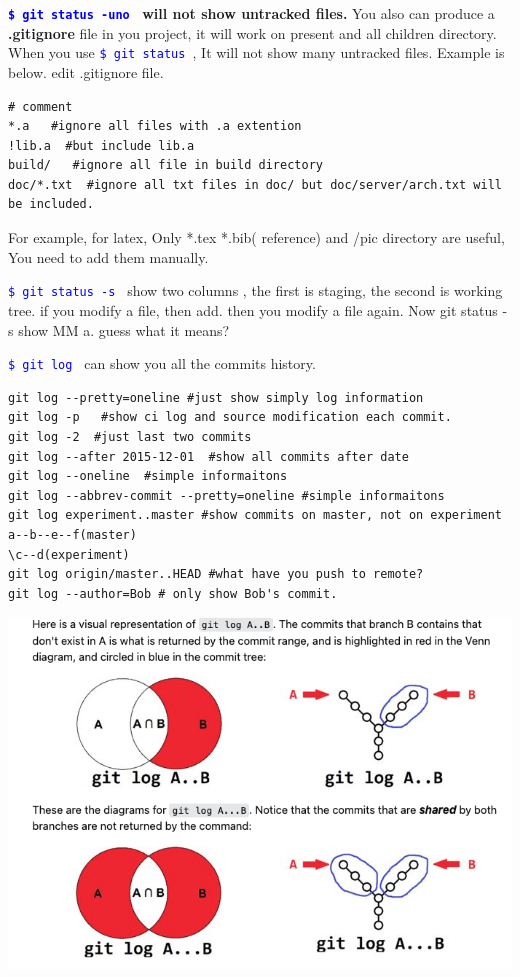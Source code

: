 \documentclass[paper=8.5in:11in, twoside, 12pt, pagesize=pdftex]{book}
\newcommand{\linuxcommand}[1]{\texttt{\textcolor{blue}{\$ #1 \Pisymbol{psy}{191}}}}
\begin{document}
	\textbf{\linuxcommand{git status -uno} will not show untracked files.} You also can produce a \textbf{.gitignore} file in you project, it will work on present and all children directory. When you use \linuxcommand{git status}, It will not show many untracked files.  Example is below. edit .gitignore file.
	
\begin{lstlisting}
# comment
*.a   #ignore all files with .a extention
!lib.a  #but include lib.a
build/   #ignore all file in build directory
doc/*.txt  #ignore all txt files in doc/ but doc/server/arch.txt will be included.	
\end{lstlisting}	
	For example, for latex,  Only *.tex *.bib( reference)  and /pic directory are useful, You need to add them manually.

	
	\linuxcommand{git status -s} show two columns , the first is staging, the second is working tree. if you modify a file,  then add. then you modify a file again. Now git status -s show MM a. guess what it means?
	
	\linuxcommand{git log} can show you all the commits history. 
\begin{lstlisting}
git log --pretty=oneline #just show simply log information
git log -p   #show ci log and source modification each commit.
git log -2  #just last two commits
git log --after 2015-12-01  #show all commits after date
git log --oneline  #simple informaitons
git log --abbrev-commit --pretty=oneline #simple informaitons
git log experiment..master #show commits on master, not on experiment
a--b--e--f(master)
\c--d(experiment)
git log origin/master..HEAD #what have you push to remote?
git log --author=Bob # only show Bob's commit.		
\end{lstlisting}	

\begin{center}
	\includegraphics[scale=0.4]{pics/revision.png}
\end{center}
	
\end{document}
